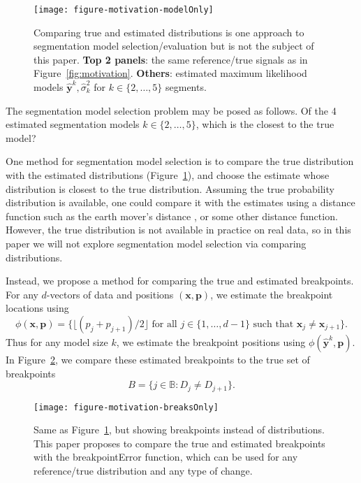 \documentclass{jsfds} %
\begin{document}
\begin{figure}[H]
  \centering
  \texttt{[image: figure-motivation-modelOnly]}
  \vskip -0.5cm
  \caption{Comparing true and estimated distributions is one approach
    to segmentation model selection/evaluation but is not the subject
    of this paper. \textbf{Top 2 panels}: the same reference/true
    signals as in Figure~\ref{fig:motivation}. \textbf{Others}:
    estimated maximum likelihood models $\mathbf{\hat y}^k,\hat
    \sigma^2_k$ for $k\in\{2, \dots, 5\}$ segments.}
  \label{fig:motivation-modelOnly}
\end{figure}

\newpage

The segmentation model selection problem may be posed as follows. Of
the 4 estimated segmentation models $k\in\{2, \dots, 5\}$, which is
the closest to the true model?

One method for segmentation model selection is to compare the true
distribution with the estimated distributions
(Figure~\ref{fig:motivation-modelOnly}), and choose the estimate whose
distribution is closest to the true distribution. Assuming the true
probability distribution is available, one could compare it with the
estimates using a distance function such as the earth mover's distance
\citep{earth-mover}, or some other distance function. However, the
true distribution is not available in practice on real data, so in
this paper we will not explore segmentation model selection via
comparing distributions.

Instead, we propose a method for comparing the true and estimated
breakpoints. For any $d$-vectors of data and positions $(\mathbf x,
\mathbf p)$, we estimate the breakpoint locations using
\begin{equation}
  \label{eq:breaks_phi}
\phi(\mathbf{x}, \mathbf p)
= \big\{
\lfloor 
(p_j+p_{j+1})/2
\rfloor
\text{ for all }j\in\{1,\dots,d-1\}\text{ such that }
\mathbf x_j\neq \mathbf x_{j+1}
\big\}.
\end{equation}
Thus for any model size $k$, we estimate the breakpoint positions
using $\phi(\mathbf{\hat y}^k, \mathbf p)$.
In Figure~\ref{fig:motivation-breaksOnly}, we compare
these estimated breakpoints to the true set of breakpoints
\begin{equation}
  \label{eq:breaks_B}
  B = \{j\in\mathbb B:D_j\neq D_{j+1}\}.
\end{equation}

\begin{figure}[H]
  \centering
  \texttt{[image: figure-motivation-breaksOnly]}
  \vskip -0.5cm
  \caption{Same as Figure~\ref{fig:motivation-modelOnly}, but showing
    breakpoints instead of distributions. This paper proposes to
    compare the true and estimated breakpoints with the
    breakpointError function, which can be used for any reference/true
    distribution and any type of change. }
  \label{fig:motivation-breaksOnly}
\end{figure}
\end{document}
